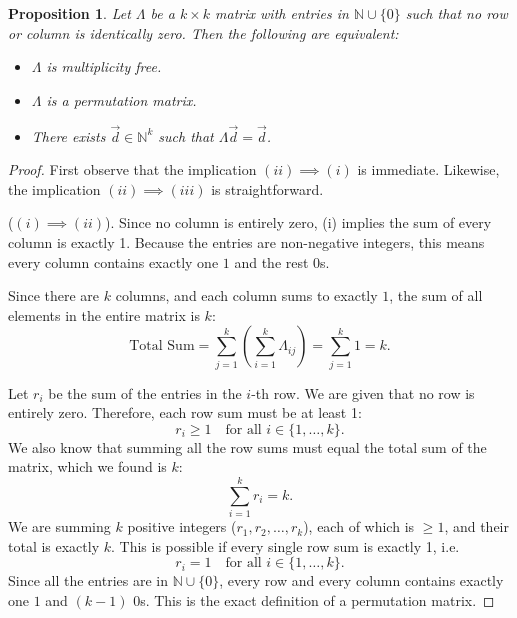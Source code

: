 \documentclass[12pt,a4paper]{amsart}
\theoremstyle{plain}
\newtheorem{prop}[theorem]{Proposition}
\theoremstyle{definition}
\theoremstyle{remark}
\numberwithin{equation}{section}
\theoremstyle{ser}
\theoremstyle{serr}
\theoremstyle{ser}
\theoremstyle{ser}
\theoremstyle{collabquestion}
\newcommand{\N}{\mathbb{N}}
\newcommand{\<}{\langle}
\renewcommand{\>}{\rangle}
\begin{document}
\begin{prop}\label{prop:mult_iff_permutation}
    Let $\Lambda$ be a $k \times k$ matrix with entries in $\N \cup \{0\}$ such that no row or column is identically zero. Then the following are equivalent:
    \begin{itemize}
        \item[(i)] $\Lambda$ is multiplicity free.
        \item[(ii)] $\Lambda$ is a permutation matrix.
        \item[(iii)] There exists $\vec{d} \in \N^k$ such that $\Lambda \vec{d} = \vec{d}$.
    \end{itemize}
\end{prop}
\begin{proof}
     First observe that the implication $(ii) \implies (i)$ is immediate. Likewise, the implication $(ii) \implies (iii)$ is straightforward.
     
    \noindent ($(i) \implies (ii)$). Since no column is entirely zero, (i) implies the sum of every column is exactly 1. Because the entries are non-negative integers, this means every column contains exactly one $1$ and the rest $0$s.

    Since there are $k$ columns, and each column sums to exactly $1$, the sum of all elements in the entire matrix is $k$:
    $$\text{Total Sum} = \sum_{j=1}^k \left( \sum_{i=1}^{k} \Lambda_{ij} \right) = \sum_{j=1}^k 1 = k.$$

    Let $r_i$ be the sum of the entries in the $i$-th row. We are given that no row is entirely zero. Therefore, each row sum must be at least 1:$$r_i \geq 1 \quad \text{for all } i \in \{1, \dots, k\}.$$
    We also know that summing all the row sums must equal the total sum of the matrix, which we found is $k$:$$\sum_{i=1}^k r_i = k.$$
    We are summing $k$ positive integers ($r_1, r_2, \dots, r_k$), each of which is $\geq 1$, and their total is exactly $k$. This is possible if every single row sum is exactly 1, i.e. $$r_i = 1 \quad \text{for all } i \in \{1, \dots, k\}.$$
    Since all the entries are in $\mathbb{N} \cup \{0\}$, every row and every column contains exactly one $1$ and $(k-1)$ $0$s. This is the exact definition of a permutation matrix.


\end{proof}
\end{document}
